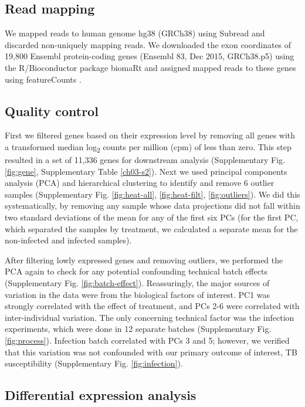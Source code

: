 \subsection{Read mapping}

We mapped reads to human genome hg38 (GRCh38) using Subread
\citep{Liao2013} and discarded non-uniquely mapping reads. We
downloaded the exon coordinates of 19,800 Ensembl \citep{Yates2016}
protein-coding genes (Ensembl 83, Dec 2015, GRCh38.p5) using the
R/Bioconductor \citep{Huber2015} package biomaRt \citep{Durinck2005,
Durinck2009} and assigned mapped reads to these genes using
featureCounts \citep{Liao2014}.
\subsection{Quality control}

First we filtered genes based on their expression level by removing
all genes with a transformed median log\textsubscript{2} counts per
million (cpm) of less than zero. This step resulted in a set of 11,336
genes for downstream analysis (Supplementary Fig. \ref{fig:gene},
Supplementary Table \ref{ch03-s2}). Next we used principal components analysis
(PCA) and hierarchical clustering to identify and remove 6 outlier
samples (Supplementary Fig. \ref{fig:heat-all}, \ref{fig:heat-filt},
\ref{fig:outliers}). We did this systematically, by removing any
sample whose data projections did not fall within two standard
deviations of the mean for any of the first six PCs (for the first PC,
which separated the samples by treatment, we calculated a separate
mean for the non-infected and infected samples).

After filtering lowly expressed genes and removing outliers, we
performed the PCA again to check for any potential confounding
technical batch effects (Supplementary Fig. \ref{fig:batch-effect}).
Reassuringly, the major sources of variation in the data were from the
biological factors of interest. PC1 was strongly correlated with the
effect of treatment, and PCs 2-6 were correlated with inter-individual
variation. The only concerning technical factor was the infection
experiments, which were done in 12 separate batches (Supplementary
Fig. \ref{fig:process}). Infection batch correlated with PCs 3 and 5;
however, we verified that this variation was not confounded with our
primary outcome of interest, TB susceptibility (Supplementary Fig.
\ref{fig:infection}).
\subsection{Differential expression analysis}

